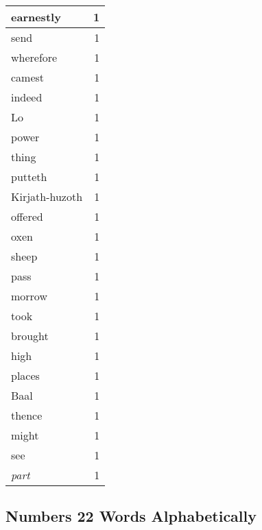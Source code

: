 \begin{center}
\begin{longtable}{l|r}
earnestly & 1\\ \hline 
send & 1\\ \hline 
wherefore & 1\\ \hline 
camest & 1\\ \hline 
indeed & 1\\ \hline 
Lo & 1\\ \hline 
power & 1\\ \hline 
thing & 1\\ \hline 
putteth & 1\\ \hline 
Kirjath-huzoth & 1\\ \hline 
offered & 1\\ \hline 
oxen & 1\\ \hline 
sheep & 1\\ \hline 
pass & 1\\ \hline 
morrow & 1\\ \hline 
took & 1\\ \hline 
brought & 1\\ \hline 
high & 1\\ \hline 
places & 1\\ \hline 
Baal & 1\\ \hline 
thence & 1\\ \hline 
might & 1\\ \hline 
see & 1\\ \hline 
\emph{part} & 1\\ \hline 
\end{longtable}
\end{center}





\subsection{Numbers 22 Words Alphabetically}


\normalsize
 
